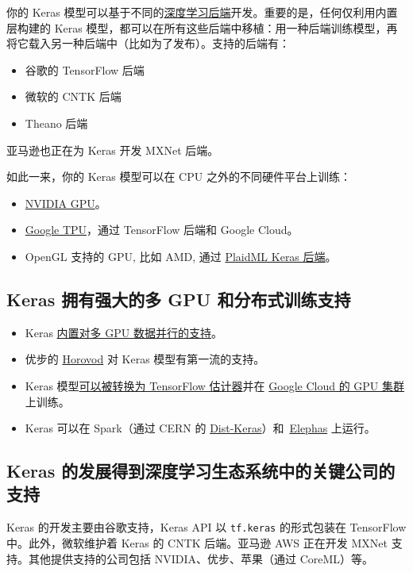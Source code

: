 你的 Keras
模型可以基于不同的\hyperref[keras-backend]{深度学习后端}开发。重要的是，任何仅利用内置层构建的
Keras
模型，都可以在所有这些后端中移植：用一种后端训练模型，再将它载入另一种后端中（比如为了发布）。支持的后端有：

\begin{itemize}
\tightlist
\item
  谷歌的 TensorFlow 后端
\item
  微软的 CNTK 后端
\item
  Theano 后端
\end{itemize}

亚马逊也正在为 Keras 开发 MXNet 后端。

如此一来，你的 Keras 模型可以在 CPU 之外的不同硬件平台上训练：

\begin{itemize}
\tightlist
\item
  \href{https://developer.nvidia.com/deep-learning}{NVIDIA GPU}。
\item
  \href{https://cloud.google.com/tpu/}{Google TPU}，通过 TensorFlow
  后端和 Google Cloud。
\item
  OpenGL 支持的 GPU, 比如 AMD, 通过
  \href{https://github.com/plaidml/plaidml}{PlaidML Keras 后端}。
\end{itemize}


\subsection{Keras 拥有强大的多 GPU
和分布式训练支持}

\begin{itemize}
\tightlist
\item
  Keras \hyperref[multi-gpu-model]{内置对多 GPU
  数据并行的支持}。
\item
  优步的 \href{https://github.com/uber/horovod}{Horovod} 对 Keras
  模型有第一流的支持。
\item
  Keras
  模型\href{https://www.tensorflow.org/versions/master/api_docs/python/tf/keras/estimator/model_to_estimator}{可以被转换为
  TensorFlow 估计器}并在
  \href{https://cloud.google.com/solutions/running-distributed-tensorflow-on-compute-engine}{Google
  Cloud 的 GPU 集群}上训练。
\item
  Keras 可以在 Spark（通过 CERN 的
  \href{https://github.com/cerndb/dist-keras}{Dist-Keras}）和~\href{https://github.com/maxpumperla/elephas}{Elephas}
  上运行。
\end{itemize}


\subsection{Keras
的发展得到深度学习生态系统中的关键公司的支持}\label{keras-ux7684ux53d1ux5c55ux5f97ux5230ux6df1ux5ea6ux5b66ux4e60ux751fux6001ux7cfbux7edfux4e2dux7684ux5173ux952eux516cux53f8ux7684ux652fux6301}

Keras 的开发主要由谷歌支持，Keras API 以 \texttt{tf.keras} 的形式包装在
TensorFlow 中。此外，微软维护着 Keras 的 CNTK 后端。亚马逊 AWS 正在开发
MXNet 支持。其他提供支持的公司包括 NVIDIA、优步、苹果（通过 CoreML）等。

\newpage
